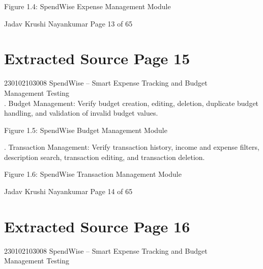 \documentclass[12pt,a4paper]{report}
\begin{document}
\smallskip

\smallskip

\smallskip

\smallskip
Figure 1.4: SpendWise Expense Management Module\\ 

\smallskip

\smallskip
Jadav Krushi Nayankumar                                                      Page 13 of 65\\ 

\clearpage
\section*{Extracted Source Page 15}
230102103008                     SpendWise – Smart Expense Tracking and Budget\\ 
Management Testing\\ 

. Budget Management: Verify budget creation, editing, deletion, duplicate budget\\ 
handling, and validation of invalid budget values.\\ 

\smallskip

\smallskip

\smallskip

\smallskip
Figure 1.5: SpendWise Budget Management Module\\ 

\smallskip

. Transaction Management: Verify transaction history, income and expense filters,\\ 
description search, transaction editing, and transaction deletion.\\ 

\smallskip

\smallskip

\smallskip

\smallskip
Figure 1.6: SpendWise Transaction Management Module\\ 

\smallskip

\smallskip

\smallskip

\smallskip
Jadav Krushi Nayankumar                                               Page 14 of 65\\ 

\clearpage
\section*{Extracted Source Page 16}
230102103008                        SpendWise – Smart Expense Tracking and Budget\\ 
Management Testing\\ 
\end{document}

